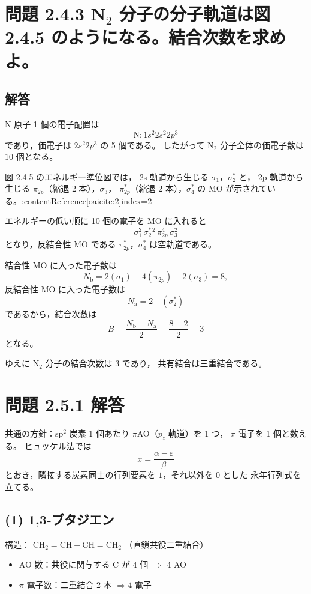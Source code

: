 \documentclass[a4paper,12pt]{jlreq}
\begin{document}
\section*{問題 2.4.3 N$_2$ 分子の分子軌道は図 2.4.5 のようになる。結合次数を求めよ。}

\subsection*{解答}

N 原子 1 個の電子配置は
\[
\mathrm{N}: 1s^2 2s^2 2p^3
\]
であり，価電子は $2s^2 2p^3$ の 5 個である。
したがって N$_2$ 分子全体の価電子数は $10$ 個となる。

図 2.4.5 のエネルギー準位図では，
2s 軌道から生じる $\sigma_1$，$\sigma_2^*$ と，
2p 軌道から生じる $\pi_{2p}$（縮退 2 本），$\sigma_3$，
$\pi_{2p}^*$（縮退 2 本），$\sigma_4^*$ の MO が示されている。:contentReference[oaicite:2]{index=2}

エネルギーの低い順に 10 個の電子を MO に入れると
\[
\sigma_1^2\,\sigma_2^{*\,2}\,
\pi_{2p}^4\,\sigma_3^2
\]
となり，反結合性 MO である $\pi_{2p}^*$，$\sigma_4^*$ は空軌道である。

結合性 MO に入った電子数は
\[
N_\mathrm{b} = 
2 (\sigma_1) +
4 (\pi_{2p}) +
2 (\sigma_3)
=8,
\]
反結合性 MO に入った電子数は
\[
N_\mathrm{a}=2 \quad (\sigma_2^*)
\]
であるから，結合次数は
\[
B=\frac{N_\mathrm{b}-N_\mathrm{a}}{2}
  =\frac{8-2}{2}=3
\]
となる。

ゆえに N$_2$ 分子の結合次数は $3$ であり，
共有結合は三重結合である。



\newpage



\section*{問題 2.5.1 解答}

共通の方針：sp$^2$ 炭素 1 個あたり $\pi$AO（$p_z$ 軌道）を 1 つ，
$\pi$ 電子を 1 個と数える。  
ヒュッケル法では
\[
x = \frac{\alpha-\varepsilon}{\beta}
\]
とおき，隣接する炭素同士の行列要素を $1$，それ以外を $0$ とした
永年行列式を立てる。

\subsection*{(1) 1,3-ブタジエン}

構造： \(\mathrm{CH_2\!=CH\!-\!CH\!=CH_2}\) （直鎖共役二重結合）

\begin{itemize}
  \item AO 数：共役に関与する C が 4 個 $\Rightarrow$ 4 AO
  \item $\pi$ 電子数：二重結合 2 本 $\Rightarrow 4$ 電子
\end{itemize}
\end{document}
